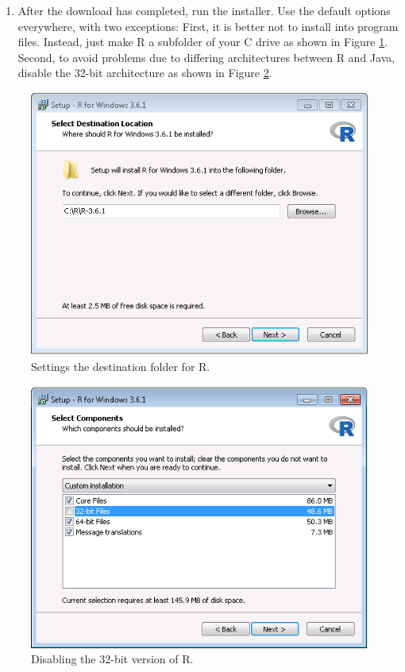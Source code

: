 \documentclass[11pt]{book}
\providecommand{\tightlist}{%
  \setlength{\itemsep}{0pt}\setlength{\parskip}{0pt}}
\theoremstyle{definition}
\theoremstyle{definition}
\theoremstyle{definition}
\theoremstyle{remark}
\begin{document}
\begin{enumerate}
\def\labelenumi{\arabic{enumi}.}
\setcounter{enumi}{1}
\tightlist
\item
  After the download has completed, run the installer. Use the default options everywhere, with two exceptions: First, it is better not to install into program files. Instead, just make R a subfolder of your C drive as shown in Figure \ref{fig:rDestination}. Second, to avoid problems due to differing architectures between R and Java, disable the 32-bit architecture as shown in Figure \ref{fig:no32Bits}.
\end{enumerate}

\begin{figure}

{\centering \includegraphics[width=0.8\linewidth]{images/OhdsiAnalyticsTools/rDestination} 

}

\caption{Settings the destination folder for R.}\label{fig:rDestination}
\end{figure}

\begin{figure}

{\centering \includegraphics[width=0.8\linewidth]{images/OhdsiAnalyticsTools/no32Bits} 

}

\caption{Disabling the 32-bit version of R.}\label{fig:no32Bits}
\end{figure}
\end{document}
